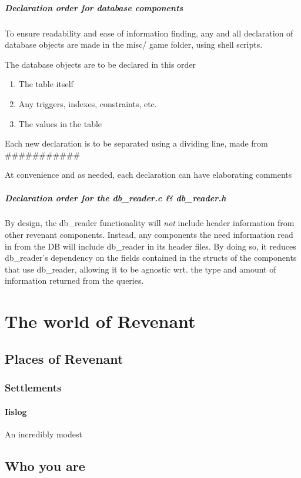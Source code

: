 \documentclass{report}
\begin{document}
\paragraph*{Declaration order for database components}
To ensure readability and ease of information finding, any and all declaration of database objects are made in the misc/ game folder, using shell scripts.

The database objects are to be declared in this order
\begin{enumerate}
\item The table itself
\item Any triggers, indexes, constraints, etc.
\item The values in the table
\end{enumerate}

Each new declaration is to be separated using a dividing line, made from \#\#\#\#\#\#\#\#\#\#\#

At convenience and as needed, each declaration can have elaborating comments
\paragraph*{Declaration order for the db\_reader.c \& db\_reader.h}
By design, the db\_reader functionality will \textit{not} include header information from other revenant components. Instead, any components the need information read in from the DB will include db\_reader in its header files. By doing so, it reduces db\_reader's dependency on the fields contained in the structs of the components that use db\_reader, allowing it to be agnostic wrt. the type and amount of information returned from the queries. 
\chapter*{The world of Revenant}

\section*{Places of Revenant}
\subsection*{Settlements}
\subsubsection*{Iislog}
An incredibly modest 
\section*{Who you are}
\end{document}
